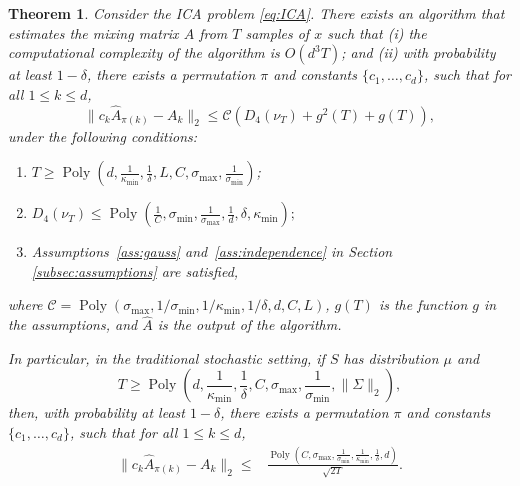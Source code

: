 \documentclass{article} %
\DeclareMathOperator{\pol}{Poly}
\newcommand{\poly}[1]{\pol\left(#1\right)}
\newtheorem{thm}[lemma]{Theorem}
\theoremstyle{definition}
\begin{document}
\begin{thm}
\label{thm:finalRes} Consider the ICA problem \eqref{eq:ICA}. There exists an algorithm that estimates the mixing matrix $A$ from $T$ samples of $x$ such that (i) the computational complexity of the algorithm is $O(d^3 T)$; and (ii) with probability at least $1-\delta$, there exists a permutation $\pi$ and constants $\{c_1,\ldots,c_d\}$, such that for all $1\le k\le d$,
\[
\| c_k\hat{A}_{\pi(k)} - A_k\|_2 \le \mathcal{C}\left(D_4(\nu_T)+g^2(T) +g(T) \right),
\]
under the following conditions:
\begin{enumerate}
\vspace{-2mm}
\item $T \ge \poly{d, \frac{1}{\kappa_{\min}}, \frac{1}{\delta}, L, C, \sigma_{\max}, \frac{1}{\sigma_{\min}}}$;
\vspace{-2mm}
\item  %
$D_4(\nu_T) \le \poly{\frac{1}{C},  \sigma_{\min},  \frac{1}{\sigma_{\max}},\frac{1}{d}, \delta, \kappa_{\min}};$
\vspace{-2mm}
\item  Assumptions~\ref{ass:gauss} and~\ref{ass:independence} in Section \ref{subsec:assumptions} are satisfied,
\end{enumerate}
where $\mathcal{C} = \poly{\sigma_{\max}, 1/\sigma_{\min}, 1/\kappa_{\min},1/\delta, d, C, L}$, $g(T)$ is the function $g$ in the assumptions, and $\hat{A}$ is the output of the algorithm.

In particular, in the traditional stochastic setting, if $S$ has distribution $\mu$ and
\[
T \ge \poly{d, \frac{1}{\kappa_{\min}}, \frac{1}{\delta}, C, \sigma_{\max}, \frac{1}{\sigma_{\min}}, \|\Sigma\|_2},
\]
then, with probability at least $1-\delta$, there exists a permutation $\pi$ and constants $\{c_1,\ldots,c_d\}$, such that for all $1\le k\le d$,
\vspace{-2mm}
\begin{align*}
 \| c_k\hat{A}_{\pi(k)} - A_k\|_2 \le 
& \frac{\poly{C, \sigma_{\max}, \frac{1}{\sigma_{\min}}, \frac{1}{\kappa_{\min}},\frac{1}{\delta}, d}}{\sqrt{2T}}.
\end{align*}
\end{thm}
\end{document}
